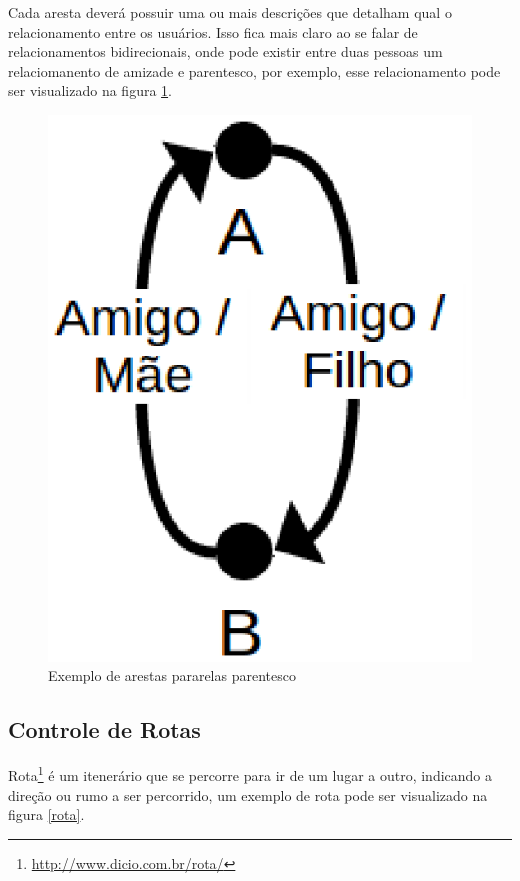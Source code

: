Cada aresta deverá possuir uma ou mais descrições que detalham qual o relacionamento entre os usuários. Isso fica mais claro ao se falar de relacionamentos bidirecionais, onde pode existir entre duas pessoas um relaciomanento de amizade e parentesco, por exemplo, esse relacionamento pode ser visualizado na figura \ref{parentes}.

\begin{figure}[!h]
	\centering
	\includegraphics[scale=0.45]{figuras/capitulo5/parentes.eps}
	\caption{Exemplo de arestas pararelas parentesco}
	\label{parentes}
\end{figure}

\subsection{Controle de Rotas}

Rota\footnote{\url{http://www.dicio.com.br/rota/}} é um itenerário que se percorre para ir de um lugar a outro, indicando a direção ou rumo a ser percorrido, um exemplo de rota pode ser visualizado na figura \ref{rota}.

